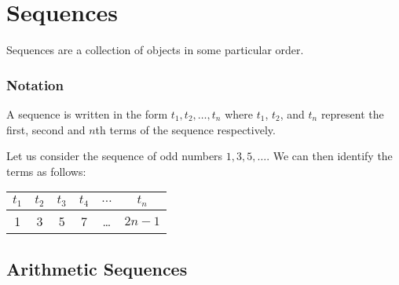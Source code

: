 \section{Sequences}

Sequences are a collection of objects in some particular order.

\subsubsection{Notation}

A sequence is written in the form $t_1, t_2, \dots, t_n$ where $t_1$, $t_2$, and $t_n$ represent the first, second and $n$th terms of the sequence respectively. \\

\begin{tcolorbox}[enhanced,
  attach boxed title to top left,
  colback=blue!5!white,
  colframe=blue!75!black,
  colbacktitle=red!80!black,
  title=Example,
  fonttitle=\bfseries,
  boxed title style={size=small,colframe=red!50!black}
  ]
Let us consider the sequence of odd numbers $1, 3, 5, \dots$. We can then identify the terms as follows:  

\begin{tabular}{|c|c|c|c|c|c|}
  \hline
  $t_1$ & $t_2$ & $t_3$ & $t_4$ & $\dots$ & $t_n$ \\
  \hline
  1 & 3 & 5 & 7 & \dots & $2n-1$ \\
  \hline
\end{tabular}
\end{tcolorbox}

\subsection{Arithmetic Sequences}



